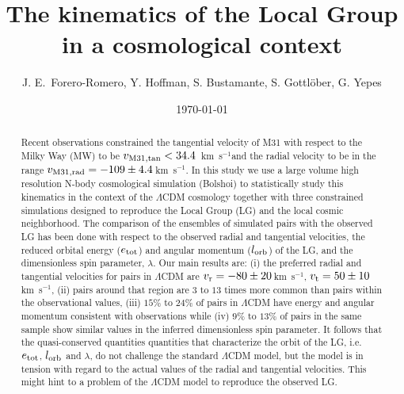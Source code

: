 \documentclass{emulateapj}
\newcommand{\kms}{\,km~s$^{-1}$}
\begin{document}
\title{The kinematics of the Local Group in a cosmological context}
\author{
J. E.\ Forero-Romero, 
Y. Hoffman, 
S. Bustamante, 
S. Gottl\"ober, 
G. Yepes
}


\date{\today}

\begin{abstract}
Recent observations constrained the tangential velocity of M31 with
respect to the Milky Way (MW) to be $v_{\rm M31,tan}<34.4$ \kms and
the radial velocity to be in the range $v_{\rm M31,rad}=-109\pm
4.4$\kms \citep{vanderMarel12}. In this study we use a large volume
high resolution N-body cosmological simulation (Bolshoi) to
statistically study this kinematics in the context of the $\Lambda$CDM
cosmology together with three constrained simulations designed to reproduce the
Local Group (LG) and the local cosmic neighborhood. The comparison of the
ensembles of simulated pairs with the observed LG has been done with
respect to the observed radial and tangential velocities, the reduced orbital
energy ($e_{\rm tot}$) and angular momentum ($l_{\rm orb}$) of the LG,
and the dimensionless spin parameter, $\lambda$. Our
main results are: (i) the preferred radial and tangential velocities
for pairs in $\Lambda$CDM are $v_{\rm r}=-80\pm 20$\kms, $v_{\rm
  t}=50\pm 10$\kms, (ii) pairs around that region are $3$ to $13$
times more common than pairs within the observational values, (iii)
$15\%$ to $24\%$ of pairs in $\Lambda$CDM have energy and angular
momentum consistent with observations while (iv) $9\%$ to $13\%$ of
pairs in the same sample show similar values in the inferred
dimensionless spin parameter. It follows that the quasi-conserved
quantities quantities that characterize the orbit of the LG,
i.e. $e_{\rm tot}$,
$l_{\rm orb}$ and $\lambda$, do not challenge the standard $\Lambda$CDM model,
but the model is in tension with regard to the actual values of the radial and
tangential velocities. This might hint to a problem of the
$\Lambda$CDM model to reproduce the observed LG.

\end{abstract}
\end{document}
